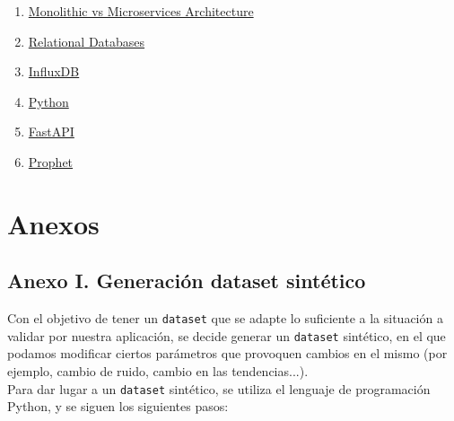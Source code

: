 \documentclass[a4paper, oneside, 12pt]{book}
\begin{document}
	\begin{enumerate}
		
		\item
		\label{bib_img: microservice architecture}
		\href{https://xbsoftware.com/blog/microservices-vs-monolithic-architecture/}{Monolithic vs Microservices Architecture}
		
		\item
		\label{bib_img: example sql}
		\href{https://xbsoftware.com/blog/main-types-of-database-management-systems/}{Relational Databases}
		
		\item
		\label{bib_img: influxdb logo}
		\href{https://www.influxdata.com/}{InfluxDB}
		
		\item
		\label{bib_img: python logo}
		\href{https://www.python.org/}{Python}
		
		\item
		\label{bib_img: fastapi logo}
		\href{https://fastapi.tiangolo.com/}{FastAPI}
		
		\item
		\label{bib_img: prophet logo}
		\href{https://facebook.github.io/prophet/}{Prophet}
		
		
	\end{enumerate}
	
	\pagebreak
	
	\chapter*{Anexos}
	
	\section*{Anexo I. Generación dataset sintético}
	\label{sec: anexo 1 dataset}
	
	\noindent Con el objetivo de tener un \texttt{dataset} que se adapte lo suficiente a la situación a validar por nuestra aplicación, se decide generar un \texttt{dataset} sintético, en el que podamos modificar ciertos parámetros que provoquen cambios en el mismo (por ejemplo, cambio de ruido, cambio en las tendencias...). \\
	
	\noindent Para dar lugar a un \texttt{dataset} sintético, se utiliza el lenguaje de programación Python, y se siguen los siguientes pasos: 
	
\end{document}
